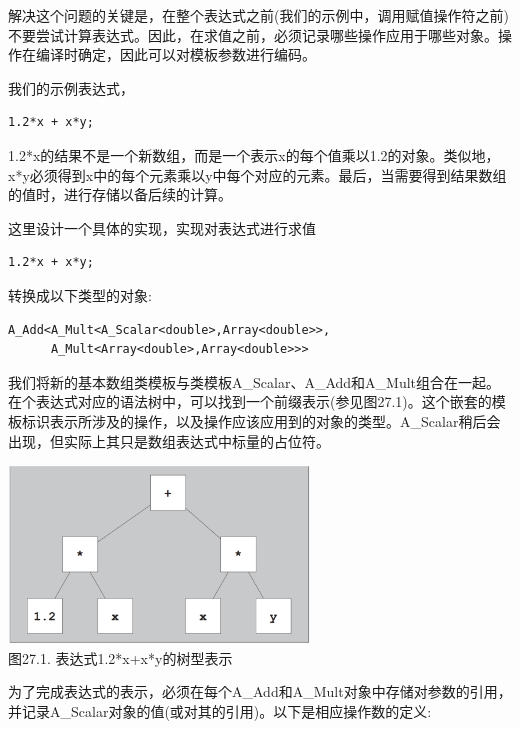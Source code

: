 
解决这个问题的关键是，在整个表达式之前(我们的示例中，调用赋值操作符之前)不要尝试计算表达式。因此，在求值之前，必须记录哪些操作应用于哪些对象。操作在编译时确定，因此可以对模板参数进行编码。

我们的示例表达式，

\begin{lstlisting}[style=styleCXX]
1.2*x + x*y;
\end{lstlisting}

1.2*x的结果不是一个新数组，而是一个表示x的每个值乘以1.2的对象。类似地，x*y必须得到x中的每个元素乘以y中每个对应的元素。最后，当需要得到结果数组的值时，进行存储以备后续的计算。

这里设计一个具体的实现，实现对表达式进行求值

\begin{lstlisting}[style=styleCXX]
1.2*x + x*y;
\end{lstlisting}

转换成以下类型的对象:

\begin{lstlisting}[style=styleCXX]
A_Add<A_Mult<A_Scalar<double>,Array<double>>,
	  A_Mult<Array<double>,Array<double>>>
\end{lstlisting}

我们将新的基本数组类模板与类模板A\_Scalar、A\_Add和A\_Mult组合在一起。在个表达式对应的语法树中，可以找到一个前缀表示(参见图27.1)。这个嵌套的模板标识表示所涉及的操作，以及操作应该应用到的对象的类型。A\_Scalar稍后会出现，但实际上其只是数组表达式中标量的占位符。

\begin{center}
\includegraphics[width=0.6\textwidth]{content/3/chapter27/images/1.png} \\
图27.1. 表达式1.2*x+x*y的树型表示
\end{center}


为了完成表达式的表示，必须在每个A\_Add和A\_Mult对象中存储对参数的引用，并记录A\_Scalar对象的值(或对其的引用)。以下是相应操作数的定义:

